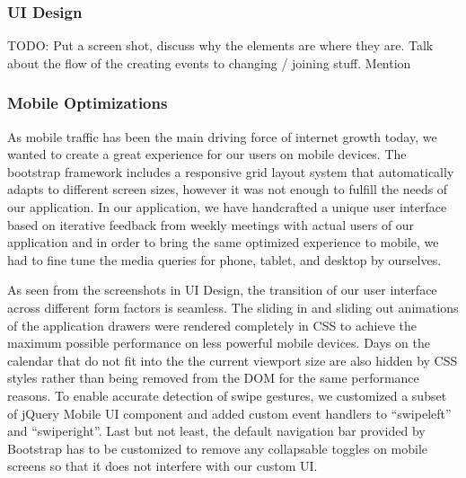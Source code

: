 \documentclass[10pt,a4paper]{article}
\begin{document}
\subsubsection{UI Design}
TODO: Put a screen shot, discuss why the elements are where they are. Talk about 
the flow of the creating events to changing / joining stuff. Mention

\subsubsection{Mobile Optimizations}
As mobile traffic has been the main driving force of internet growth today, we wanted to create a great experience for our users on mobile devices. The bootstrap framework includes a responsive grid layout system that automatically adapts to different screen sizes, however it was not enough to fulfill the needs of our application. In our application, we have handcrafted a unique user interface based on iterative feedback from weekly meetings with actual users of our application and in order to bring the same optimized experience to mobile, we had to fine tune the media queries for phone, tablet, and desktop by ourselves.

As seen from the screenshots in UI Design, the transition of our user interface across different form factors is seamless. The sliding in and sliding out animations of the application drawers were rendered completely in CSS to achieve the maximum possible performance on less powerful mobile devices. Days on the calendar that do not fit into the the current viewport size are also hidden by CSS styles rather than being removed from the DOM for the same performance reasons. To enable accurate detection of swipe gestures, we customized a subset of jQuery Mobile UI component and added custom event handlers to “swipeleft” and “swiperight”. Last but not least, the default navigation bar provided by Bootstrap has to be customized to remove any collapsable toggles on mobile screens so that it does not interfere with our custom UI.
\end{document}
